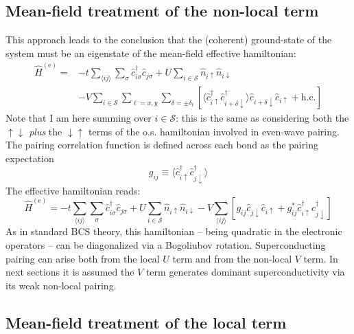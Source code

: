\subsection{Mean-field treatment of the non-local term}

This approach leads to the conclusion that the (coherent) ground-state of the system must be an eigenstate of the mean-field effective hamiltonian:
\begin{equation}\label{eq:extended-hubbard-model-effective-intermediate}
	\begin{aligned}
		\hat H^{(\mathrm{e})} =
		&-t \sum_{\langle ij \rangle} \sum_\sigma \hat c_{i\sigma}^\dagger \hat c_{j\sigma}
		+ U \sum_{i \in \mathcal{S}} \hat n_{i\uparrow} \hat n_{i\downarrow} \\
		&- V \sum_{i \in \mathcal{S}} \sum_{\ell = x,y} \sum_{\delta = \pm \delta_\ell} \left[
			\langle 
				\hat c_{i\uparrow}^\dagger \hat c_{i + \delta \downarrow}^\dagger
			\rangle
			\hat c_{i + \delta \downarrow} \hat c_{i\uparrow} 
			+ \mathrm{h}.\mathrm{c}.
		\right]
	\end{aligned}
\end{equation}
Note that I am here summing over $i\in \mathcal{S}$: this is the same as considering both the $\uparrow\downarrow$ \textit{plus} the $\downarrow\uparrow$ terms of the o.s. hamiltonian involved in even-wave pairing. The pairing correlation function is defined across each bond as the pairing expectation
\[
	g_{ij} \equiv \langle 
		\hat c_{i\uparrow}^\dagger \hat c_{j\downarrow}^\dagger
	\rangle
\]
The effective hamiltonian reads:
\begin{equation}\label{eq:extended-hubbard-model-effective-intermediate-2}
	\hat H^{(\mathrm{e})} =
	-t \sum_{\langle ij \rangle} \sum_\sigma \hat c_{i\sigma}^\dagger \hat c_{j\sigma}
	+ U \sum_{i \in \mathcal{S}} \hat n_{i\uparrow} \hat n_{i\downarrow}
	- V \sum_{\langle ij \rangle} \left[
		g_{ij} \hat c_{j\downarrow} \hat c_{i\uparrow} + g_{ij}^* \hat c_{i\uparrow}^\dagger \hat c_{j\downarrow}^\dagger
	\right]
\end{equation}
As in standard $\mathrm{BCS}$ theory, this hamiltonian -- being quadratic in the electronic operators -- can be diagonalized via a Bogoliubov rotation. Superconducting pairing can arise both from the local $U$ term and from the non-local $V$ term. In next sections it is assumed the $V$ term generates dominant superconductivity via its weak non-local pairing.

\subsection{Mean-field treatment of the local term}

